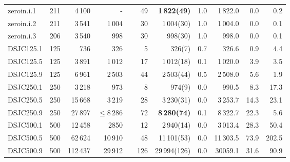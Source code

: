 \documentclass{elsart}
\begin{document}
\begin{table}
\begin{scriptsize}
\begin{tabular}{lrrrcrrrrrr}
zeroin.i.1    & 211 & 4\,100   & -  &&49&  \textbf{1\,822(49)}  &1.0& 1\,822.0&0.0 & 0.2\\
zeroin.i.2    & 211 & 3\,541   &  1\,004 &&30&  1\,004(30)  &1.0& 1\,004.0&0.0 & 0.1\\
zeroin.i.3    & 206 & 3\,540  &  998 &&30&  998(30)  &1.0& 998.0&0.0 & 0.1  \\
\hline
DSJC125.1    & 125 & 736  & 326 &&5& 326(7)  &0.7& 326.6&0.9 & 4.4  \\
DSJC125.5    & 125 & 3\,891   & 1\,012  &&17& 1\,012(18)  &0.1& 1\,020.0&3.9 & 3.5 \\
DSJC125.9    & 125 & 6\,961   & 2\,503 &&44& 2\,503(44)  &0.5& 2\,508.0&5.6 & 1.9 \\
DSJC250.1    & 250 & 3\,218   & 973 &&8& 974(9)  &0.0& 990.5&8.3 & 17.3   \\
DSJC250.5    & 250 & 15\,668  &3\,219   &&28&3\,230(31)  &0.0& 3\,253.7&14.3 & 23.1 \\
DSJC250.9    &250 & 27\,897  &  $\le 8\,286$ &&72&  \textbf{8\,280(74)}  &0.1& 8\,322.7&22.3 & 5.6  \\

DSJC500.1    & 500 & 12\,458   & 2850 &&12& 2\,940(14)  &0.0& 3\,013.4& 28.3 & 50.4  \\
DSJC500.5    & 500 & 62\,624  &10\,910   &&48&11\,101(53)  &0.0& 11\,303.5 &73.9 & 202.5 \\
DSJC500.9    & 500 & 112\,437  &29\,912 &&126&  29\,994(126)  &0.0& 30059.1&31.6  & 90.9  \\


\end{tabular}
\end{scriptsize}
\end{table}
\end{document}
